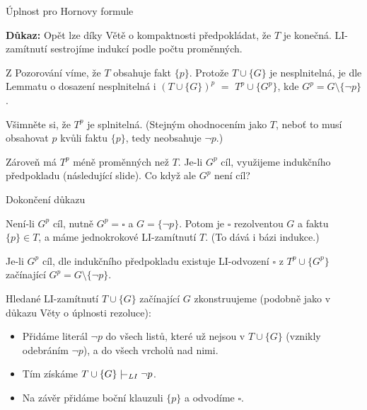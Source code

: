 \documentclass{beamer}
\begin{document}
\begin{frame}{Úplnost pro Hornovy formule}
 

    \textbf{Důkaz:} Opět lze díky Větě o kompaktnosti předpokládat, že $T$ je konečná. LI-zamítnutí sestrojíme indukcí podle počtu proměnných.

    Z Pozorování víme, že $T$ obsahuje fakt $\{p\}$. Protože $T\cup\{G\}$ je nesplnitelná, je dle Lemmatu o dosazení \alert{nesplnitelná i} $(T\cup\{G\})^p$ $=$ \alert{$T^p\cup\{G^p\}$}, kde $G^p=G\setminus\{\neg p\}$.
    
    Všimněte si, že \alert{$T^p$ je splnitelná}. (Stejným ohodnocením jako $T$, neboť to musí obsahovat $p$ kvůli faktu $\{p\}$, tedy neobsahuje $\neg p$.) 
    
    Zároveň má $T^p$ méně proměnných než $T$. \alert{Je-li $G^p$ cíl}, využijeme indukčního předpokladu (následující slide). Co když ale $G^p$ není cíl?       
    
\end{frame}


\begin{frame}{Dokončení důkazu}

    \alert{Není-li $G^p$ cíl}, nutně $G^p=\square$ a $G=\{\neg p\}$. Potom je $\square$ rezolventou $G$ a faktu $\{p\}\in T$, a máme jednokrokové LI-zamítnutí $T$. (To dává i \alert{bázi indukce}.)


    \alert{Je-li $G^p$ cíl}, dle \alert{indukčního předpokladu} existuje LI-odvození $\square$ z $T^p\cup\{G^p\}$ začínající $G^p=G\setminus\{\neg p\}$.
    
    Hledané LI-zamítnutí $T\cup\{G\}$ začínající $G$ zkonstruujeme (podobně jako v důkazu Věty o úplnosti rezoluce):

    \begin{itemize}
        \item Přidáme literál $\neg p$ do všech listů, které už nejsou v $T\cup\{G\}$ (vznikly odebráním $\neg p$), a do všech vrcholů nad nimi.
        \item Tím získáme $T\cup\{G\}\proves_{LI}\neg p$.
        \item Na závěr přidáme boční klauzuli $\{p\}$ a odvodíme $\square$.\hfill\qedsymbol
    \end{itemize}

\end{frame}
\end{document}
